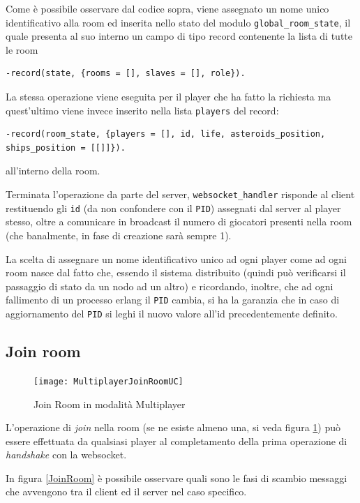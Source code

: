 \documentclass[paper=a4, fontsize=11pt]{scrartcl} %
\numberwithin{equation}{section} %
\numberwithin{figure}{section} %
\numberwithin{table}{section} %
\begin{document}
Come è possibile osservare dal codice sopra, viene assegnato un nome unico identificativo alla room ed inserita nello stato del modulo \texttt{global\_room\_state}, il quale presenta al suo interno un campo di tipo record contenente la lista di tutte le room
\begin{lstlisting}[basicstyle=\footnotesize]
-record(state, {rooms = [], slaves = [], role}).
\end{lstlisting}
La stessa operazione viene eseguita per il player che ha fatto la richiesta ma quest'ultimo viene invece inserito nella lista \texttt{players} del record:
\begin{lstlisting}[basicstyle=\footnotesize]
-record(room_state, {players = [], id, life, asteroids_position, ships_position = [[]]}).
\end{lstlisting}
all'interno della room.

Terminata l'operazione da parte del server, \texttt{websocket\_handler} risponde al client restituendo gli \texttt{id} (da non confondere con il \texttt{PID}) assegnati dal server al player stesso, oltre a comunicare in broadcast il numero di giocatori presenti nella room (che banalmente, in fase di creazione sarà sempre 1).

La scelta di assegnare un nome identificativo unico ad ogni player come ad ogni room nasce dal fatto che, essendo il sistema distribuito (quindi può verificarsi il passaggio di stato da un nodo ad un altro) e ricordando, inoltre, che ad ogni fallimento di un processo erlang il \texttt{PID} cambia, si ha la garanzia che in caso di aggiornamento del \texttt{PID} si leghi il nuovo valore all'id precedentemente definito. 



\subsection{Join room}

\begin{figure}
\centering
\texttt{[image: MultiplayerJoinRoomUC]}
\caption{Join Room in modalità Multiplayer}
\label{JoinRoomUC}
\end{figure}

L'operazione di \textit{join} nella room (se ne esiste almeno una, si veda figura \ref{JoinRoomUC}) può essere effettuata da qualsiasi player al completamento della prima operazione di \textit{handshake} con la websocket.

In figura \ref{JoinRoom} è possibile osservare quali sono le fasi di scambio messaggi che avvengono tra il client ed il server nel caso specifico.
\end{document}
